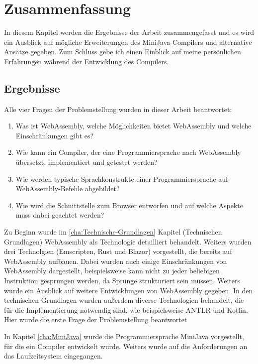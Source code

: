 \chapter{Zusammenfassung}

In diesem Kapitel werden die Ergebnisse der Arbeit zusammengefasst und es wird ein Ausblick auf mögliche Erweiterungen des MiniJava-Compilers und alternative Ansätze gegeben. Zum Schluss gebe ich einen Einblick auf meine persönlichen Erfahrungen während der Entwicklung des Compilers.

\section{Ergebnisse}

Alle vier Fragen der Problemstellung wurden in dieser Arbeit beantwortet:
\begin{enumerate}
	\item Was ist WebAssembly, welche Möglichkeiten bietet WebAssembly und welche Einschränkungen gibt es?
	\item Wie kann ein Compiler, der eine Programmiersprache nach WebAssembly übersetzt, implementiert und getestet werden?
	\item Wie werden typische Sprachkonstrukte einer Programmiersprache auf Web\-Assem\-bly-Befehle abgebildet?
	\item Wie wird die Schnittstelle zum Browser entworfen und auf welche Aspekte muss dabei geachtet werden?
\end{enumerate}

Zu Beginn wurde im \ref{cha:Technische-Grundlagen} Kapitel (Technischen Grundlagen) WebAssembly als Technologie detailliert behandelt. Weiters wurden drei Technolgien (Emscripten, Rust und Blazor) vorgestellt, die bereits auf WebAssembly aufbauen. Dabei wurden auch einige Einschränkungen von WebAssembly dargestellt, beispielsweise kann nicht zu jeder beliebigen Instruktion gesprungen werden, da Sprünge strukturiert sein müssen. Weiters wurde ein Ausblick auf weitere Entwicklungen von WebAssembly gegeben. In den technischen Grundlagen wurden außerdem diverse Technologien behandelt, die für die Implementierung notwendig sind, wie beispielsweise ANTLR und Kotlin. Hier wurde die erste Frage der Problemstellung beantwortet

In Kapitel \ref{cha:MiniJava} wurde die Programmiersprache MiniJava vorgestellt, für die ein Compiler entwickelt wurde. Weiters wurde auf die Anforderungen an das Laufzeitsystem eingegangen.

